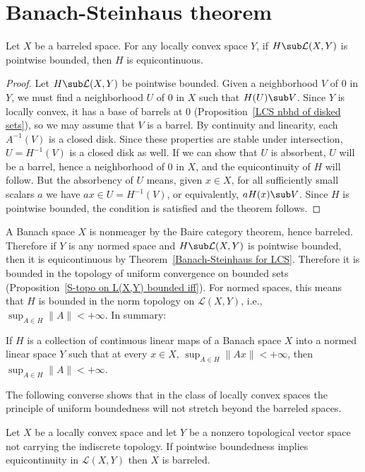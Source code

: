 \section{Banach-Steinhaus theorem}
\begin{theorem}\label{Banach-Steinhaus for LCS}
Let $X$ be a barreled space. For any locally convex space $Y$, if $H\sub\mathcal{L}(X,Y)$ is pointwise bounded, then $H$ is equicontinuous.
\end{theorem}
\begin{proof}
Let $H\sub\mathcal{L}(X,Y)$ be pointwise bounded. Given a neighborhood $V$ of $0$ in $Y$, we must find a neighborhood $U$ of $0$ in $X$ such that $H(U)\sub V$. Since $Y$ is locally convex, it has a base of barrels at $0$ (Proposition~\ref{LCS nbhd of disked sets}), so we may assume that $V$ is a barrel. By continuity and linearity, each $A^{-1}(V)$ is a closed disk. Since these properties are stable under intersection, $U=H^{-1}(V)$ is a closed disk as well. If we can show that $U$ is absorbent, $U$ will be a barrel, hence a neighborhood of $0$ in $X$, and the equicontinuity of $H$ will follow. But the absorbency of $U$ means, given $x\in X$, for all sufficiently small scalars $a$ we have $ax\in U=H^{-1}(V)$, or equivalently, $aH(x)\sub V$. Since $H$ is pointwise bounded, the condition is satisfied and the theorem follows.
\end{proof}
A Banach space $X$ is nonmeager by the Baire category theorem, hence barreled. Therefore if $Y$ is any normed space and $H\sub\mathcal{L}(X,Y)$ is pointwise bounded, then it is equicontinuous by Theorem~\ref{Banach-Steinhaus for LCS}. Therefore it is bounded in the topology of uniform convergence on bounded sets (Proposition~\ref{S-topo on L(X,Y) bounded iff}). For normed spaces, this means that $H$ is bounded in the norm topology on $\mathcal{L}(X,Y)$, i.e., $\sup_{A\in H}\|A\|<+\infty$. In summary:
\begin{theorem}\label{Banach-Steinhaus for NVS}
If $H$ is a collection of continuous linear maps of a Banach space $X$ into a normed linear space $Y$ such that at every $x\in X$, $\sup_{A\in H}\|Ax\|<+\infty$, then $\sup_{A\in H}\|A\|<+\infty$.
\end{theorem}
The following converse shows that in the class of locally convex spaces the principle of uniform boundedness will not stretch beyond the barreled spaces.
\begin{proposition}
Let $X$ be a locally convex space and let $Y$ be a nonzero topological vector space not carrying the indiscrete topology. If pointwise boundedness implies equicontinuity in $\mathcal{L}(X,Y)$ then $X$ is barreled.
\end{proposition}
